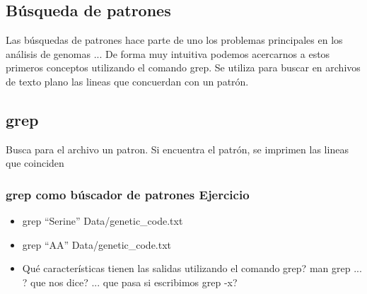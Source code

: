 \documentclass[10pt]{article}
\begin{document}
\subsection{Búsqueda de patrones}
Las búsquedas de patrones hace parte de uno los problemas principales en los análisis de genomas ... De forma muy intuitiva podemos acercarnos a estos primeros conceptos utilizando el comando grep. Se utiliza para buscar en archivos de texto plano las lineas que concuerdan con un patrón. 

\subsection{grep}
Busca para el archivo un patron. Si encuentra el patrón, se imprimen las lineas que coinciden

\subsubsection{grep como búscador de patrones Ejercicio}
\begin{itemize}
\item grep ``Serine'' Data/genetic\_code.txt
\item grep ``AA'' Data/genetic\_code.txt
\item Qué características tienen las salidas utilizando el comando grep? man grep ... ? que nos dice? ... que pasa si escribimos grep -x?
\end{itemize}
\end{document}
